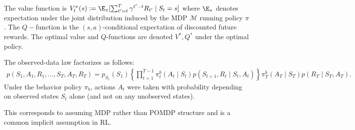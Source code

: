 \documentclass[opre,nonblindrev]{informs4}
\begin{document}
The value function is $V^\pi_t(s) := \E_\pi[ \sum_{t'=t}^{T} \gamma^{t'-t} R_{t'} \mid S_t=s ]$ where $\E_\pi$ denotes expectation under the joint distribution induced by the MDP $\mathcal{M}$ running policy $\pi$. The $Q-$function is the $(s,a)$-conditional expectation of discounted future rewards.
The optimal value and $Q$-functions are denoted $V^*,Q^*$ under the optimal policy. %
\begin{assumption}
\label{asn-sequential-unconf}
The observed-data law factorizes as follows:
\begingroup
\setlength{\abovedisplayskip}{6pt}
\setlength{\abovedisplayshortskip}{6pt}
\setlength{\belowdisplayskip}{6pt}
\setlength{\belowdisplayshortskip}{6pt}
\begin{align*}
\textstyle p(S_1,A_1,R_1, \dots, S_T,A_T,R_T) = p_{S_1}(S_1)
\left\{ \prod_{t=1}^{T-1} \pi_t^b(A_t \mid S_t)
p(S_{t+1},R_t \mid S_t,A_t)\right\} 
\pi_T^b(A_T \mid S_T)p(R_T\mid S_T,A_T).
\end{align*}
\endgroup
Under the behavior policy $\pi_b$, actions $A_t$ were taken with probability depending on observed states $S_t$ alone (and not on any unobserved states).
\end{assumption}
This corresponds to assuming MDP rather than POMDP structure and is a common implicit assumption in RL.
\end{document}
